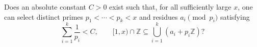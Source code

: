 Does an absolute constant $C>0$ exist such that, for all sufficiently large $x$, one can select distinct primes $p_1<\cdots<p_k<x$ and residues $a_i\pmod{p_i}$ satisfying
\[\sum_{i=1}^k\frac1{p_i}<C,\qquad
[1,x)\cap\mathbb Z\subseteq\bigcup_{i=1}^k(a_i+p_i\mathbb Z)?\]
